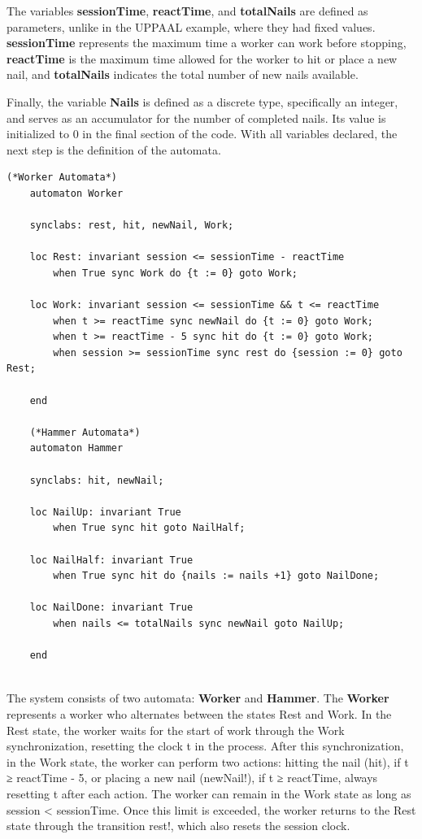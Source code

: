 The variables \textbf{sessionTime}, \textbf{reactTime}, and \textbf{totalNails} are defined as parameters, unlike in the UPPAAL example, where they had fixed values. \textbf{sessionTime} represents the maximum time a worker can work before stopping, \textbf{reactTime} is the maximum time allowed for the worker to hit or place a new nail, and \textbf{totalNails} indicates the total number of new nails available.

Finally, the variable \textbf{Nails} is defined as a discrete type, specifically an integer, and serves as an accumulator for the number of completed nails. Its value is initialized to 0 in the final section of the code. With all variables declared, the next step is the definition of the automata.

\begin{lstlisting}[language=UPPAAL]
    (*Worker Automata*)
    automaton Worker
    
    synclabs: rest, hit, newNail, Work;
    
    loc Rest: invariant session <= sessionTime - reactTime
      	when True sync Work do {t := 0} goto Work;
    
    loc Work: invariant session <= sessionTime && t <= reactTime
      	when t >= reactTime sync newNail do {t := 0} goto Work;
      	when t >= reactTime - 5 sync hit do {t := 0} goto Work;
      	when session >= sessionTime sync rest do {session := 0} goto Rest;
    
    end
    
    (*Hammer Automata*)
    automaton Hammer
    
    synclabs: hit, newNail;
    
    loc NailUp: invariant True
      	when True sync hit goto NailHalf;
    
    loc NailHalf: invariant True
      	when True sync hit do {nails := nails +1} goto NailDone;
    
    loc NailDone: invariant True
      	when nails <= totalNails sync newNail goto NailUp;
    
    end


\end{lstlisting}


The system consists of two automata: \textbf{Worker} and \textbf{Hammer}. The \textbf{Worker} represents a worker who alternates between the states Rest and Work. In the Rest state, the worker waits for the start of work through the Work synchronization, resetting the clock t in the process. After this synchronization, in the Work state, the worker can perform two actions: hitting the nail (hit), if t ≥ reactTime - 5, or placing a new nail (newNail!), if t ≥ reactTime, always resetting t after each action. The worker can remain in the Work state as long as session < sessionTime. Once this limit is exceeded, the worker returns to the Rest state through the transition rest!, which also resets the session clock.

